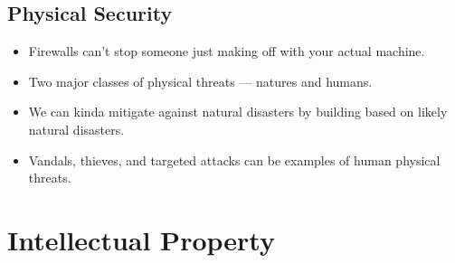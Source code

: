 \documentclass{article}
\begin{document}
\subsection{Physical Security}
\begin{itemize}
    \item Firewalls can't stop someone just making off with your actual machine.
    \item Two major classes of physical threats --- natures and humans.
    \item We can kinda mitigate against natural disasters by building based on likely natural disasters.
    \item Vandals, thieves, and targeted attacks can be examples of human physical threats.
\end{itemize}

\section{Intellectual Property}
\end{document}
